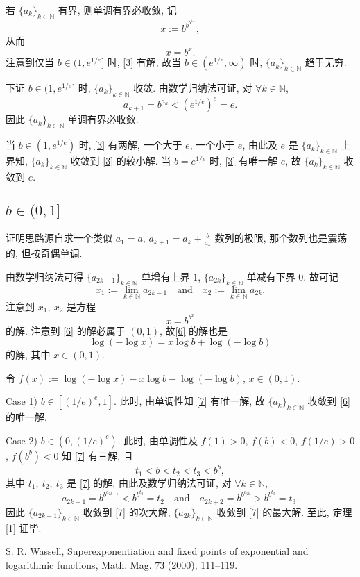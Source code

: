 \documentclass[a4paper,11pt]{article}
\theoremstyle{definition}
\begin{document}
若 $ \{a_k\}_{k \in \mathbb{N}} $ 有界, 则单调有界必收敛, 记
$$
    x := b^{b^{b^{b \cdots}}},
$$
从而
\begin{equation} \label{3}
    x = b^x.
\end{equation}
注意到仅当 $ b \in (1, e^{1/e}] $ 时, \eqref{3} 有解, 
故当 $ b \in (e^{1/e}, \infty) $ 时, $ \{a_k\}_{k \in \mathbb{N}} $ 趋于无穷.

下证 $ b \in (1, e^{1/e}] $ 时, $ \{a_k\}_{k \in \mathbb{N}} $ 收敛.
由数学归纳法可证, 对 $ \forall k \in \mathbb{N} $,
$$
    a_{k + 1} = b^{a_k} < \left( e^{1/e} \right)^e = e.
$$
因此 $ \{a_k\}_{k \in \mathbb{N}} $ 单调有界必收敛. 

当 $ b \in (1, e^{1/e}) $ 时, \eqref{3} 有两解, 一个大于 $ e $, 一个小于 $ e $,
由此及 $ e $ 是 $ \{a_k\}_{k \in \mathbb{N}} $ 上界知, 
$ \{a_k\}_{k \in \mathbb{N}} $ 收敛到 \eqref{3} 的较小解.
当 $ b = e^{1/e} $ 时, \eqref{3} 有唯一解 $ e $, 
故 $ \{a_k\}_{k \in \mathbb{N}} $ 收敛到 $ e $.

\subsection{$b \in (0, 1]$}

证明思路源自求一个类似 $ a_1 = a $, $ a_{k + 1} = a_k + \frac{b}{a_k} $ 数列的极限,
那个数列也是震荡的, 但按奇偶单调.

由数学归纳法可得 $ \{a_{2k-1}\}_{k \in \mathbb{N}} $ 单增有上界 $ 1 $, 
$ \{a_{2k}\}_{k \in \mathbb{N}} $ 单减有下界 $ 0 $.
故可记 
$$
    x_1 := \lim_{k \in \mathbb{N}} a_{2k-1}
        \quad \text{and} \quad
    x_2 := \lim_{k \in \mathbb{N}} a_{2k}.
$$
注意到 $ x_1,\ x_2 $ 是方程
\begin{equation} \label{6}
    x = b^{b^x} 
\end{equation}
的解. 注意到 \eqref{6} 的解必属于 $ (0, 1) $, 故\eqref{6} 的解也是
\begin{equation} \label{7}
    \log (- \log x) = x \log b +  \log (- \log b)
\end{equation}
的解, 其中 $ x \in (0, 1) $.

令 $ f(x) := \log (- \log x) - x \log b - \log (- \log b) $, $ x \in (0, 1) $.

Case 1) $ b \in [(1/e)^e, 1] $. 此时, 由单调性知 \eqref{7} 有唯一解, 故
$ \{a_k\}_{k \in \mathbb{N}} $ 收敛到 \eqref{6} 的唯一解.

Case 2) $ b \in (0, (1/e)^e) $. 此时, 由单调性及 
$ f(1) > 0 $, $ f(b) < 0 $, $ f(1/e) > 0 $, $ f(b^b) < 0 $ 知 \eqref{7} 有三解, 且 
$$ 
    t_1 < b < t_2 < t_3 < b^b,
$$
其中 $ t_1,\ t_2,\ t_3 $ 是 \eqref{7} 的解.
由此及数学归纳法可证, 对 $ \forall k \in \mathbb{N} $,
$$
    a_{2k+1} = b^{b^{a_{2k-1}}} < b^{b^{t_2}} = t_2
        \quad \text{and} \quad
    a_{2k+2} = b^{b^{a_{2k}}} > b^{b^{t_3}} = t_3.
$$
因此 $ \{a_{2k-1}\}_{k \in \mathbb{N}} $ 收敛到 \eqref{7} 的次大解, 
$ \{a_{2k}\}_{k \in \mathbb{N}} $ 收敛到 \eqref{7} 的最大解.  
至此, 定理 \ref{1} 证毕.

\begin{thebibliography}{99}  
    S. R. Wassell, 
    Superexponentiation and fixed points of exponential and logarithmic functions,
    Math. Mag. 73 (2000), 111--119.
\end{thebibliography}
\end{document}
